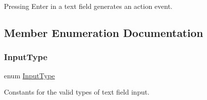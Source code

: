 Pressing Enter in a text field generates an action event. 

\subsection{Member Enumeration Documentation}
\mbox{\label{classGTextField_a5fc772c800c3d40d2b95564e8a839bab}} 
\subsubsection{\texorpdfstring{Input\+Type}{InputType}}
{\footnotesize\ttfamily enum \mbox{\hyperlink{classGTextField_a5fc772c800c3d40d2b95564e8a839bab}{Input\+Type}}}



Constants for the valid types of text field input. 


